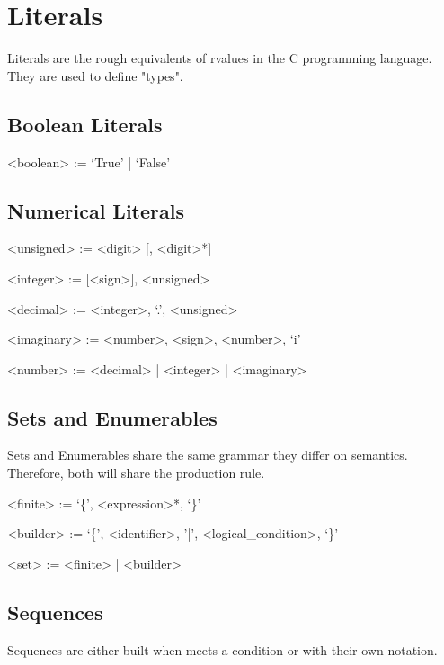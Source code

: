 \documentclass[11pt,a4paper]{book}
\begin{document}
\section{Literals}

Literals are the rough equivalents of rvalues in the C programming language. They are used to define "types".

\subsection{Boolean Literals}

\begin{grammar}
<boolean> := `True' | `False'
\end{grammar}

\subsection{Numerical Literals}

\begin{grammar}

<unsigned> := <digit> [, <digit>*]

<integer> := [<sign>], <unsigned>

<decimal> := <integer>, `.', <unsigned>

<imaginary> := <number>, <sign>, <number>, `i'

<number> := <decimal> | <integer> | <imaginary>
\end{grammar}

\subsection{Sets and Enumerables}

Sets and Enumerables share the same grammar they differ on semantics. Therefore, both will share the  production rule.

\begin{grammar}
<finite> := `\{', <expression>*, `\}'

<builder> := `\{', <identifier>, '|', <logical\_condition>, `\}'

<set> := <finite> | <builder>
\end{grammar}

\subsection{Sequences}

Sequences are either built when  meets a condition or with their own notation.
\end{document}
